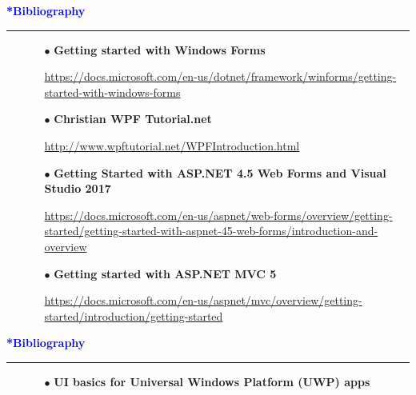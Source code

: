 \documentclass[pdf]{beamer}
\begin{document}
{{{{{{{{
\begin{frame}
	\vspace{8mm}
	\textcolor{Blue}{\textbf{\Large{*Bibliography}}}
    \textcolor{red}{\rule{10cm}{1mm}}

    \begin{itemize}
    	\item[] 
        \begin{itemize}
        	\item[{$\bullet$}] \textbf{Getting started with Windows Forms}

\url{https://docs.microsoft.com/en-us/dotnet/framework/winforms/getting-started-with-windows-forms}
        	
        	\item[{$\bullet$}] \textbf{Christian WPF Tutorial.net}

\url{http://www.wpftutorial.net/WPFIntroduction.html}
        	
        	\item[{$\bullet$}] \textbf{Getting Started with ASP.NET 4.5 Web Forms and Visual Studio 2017}

\url{https://docs.microsoft.com/en-us/aspnet/web-forms/overview/getting-started/getting-started-with-aspnet-45-web-forms/introduction-and-overview}

			\item[{$\bullet$}] \textbf{Getting started with ASP.NET MVC 5}

\url{https://docs.microsoft.com/en-us/aspnet/mvc/overview/getting-started/introduction/getting-started}
     	\end{itemize}
   	\end{itemize}
\end{frame}}



{
\begin{frame}
	\vspace{8mm}
	\textcolor{Blue}{\textbf{\Large{*Bibliography}}}
    \textcolor{red}{\rule{10cm}{1mm}}

    \begin{itemize}
    	\item[] 
        \begin{itemize}        	
        	\item[{$\bullet$}] \textbf{UI basics for Universal Windows Platform (UWP) apps}
        	

\end{itemize}
\end{itemize}
\end{frame}}}}}}}}}
\end{document}
